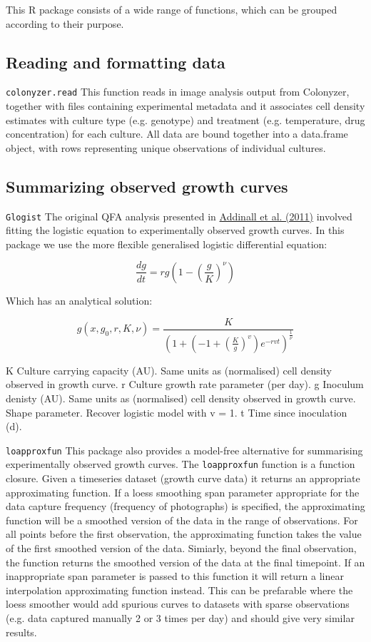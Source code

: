 \documentclass [a4paper]{article}
\begin{document}
This R package consists of a wide range of functions, which can be grouped according to their purpose.

\subsection{Reading and formatting data}
\verb$colonyzer.read$
This function reads in image analysis output from Colonyzer, together with files containing experimental metadata and it associates cell density estimates with culture type (e.g. genotype) and treatment (e.g. temperature, drug concentration) for each culture.  All data are bound together into a data.frame object, with rows representing unique observations of individual cultures.

\subsection{Summarizing observed growth curves}
\verb$Glogist$
The original QFA analysis presented in \href{http://dx.doi.org/10.1371/journal.pgen.1001362}{Addinall et al. (2011)} involved fitting the logistic equation to experimentally observed growth curves.  In this package we use the more flexible generalised logistic differential equation:

\begin{equation}
\frac{dg}{dt}=rg(1-(\frac{g}{K})^\nu)
\end{equation}

Which has an analytical solution:

\begin{equation}
g(x,g_0,r,K,\nu)=\frac{K}{(1+(-1+(\frac{K}{g})^v)e^{-rvt})^\frac{1}{\nu}}
\end{equation}

K	Culture carrying capacity (AU). Same units as (normalised) cell density observed in growth curve.
r	Culture growth rate parameter (per day).
g	Inoculum denisty (AU). Same units as (normalised) cell density observed in growth curve.
\nu	Shape parameter. Recover logistic model with v = 1.
t	Time since inoculation (d).

\verb$loapproxfun$
This package also provides a model-free alternative for summarising experimentally observed growth curves.  The \verb$loapproxfun$ function is a function closure. Given a timeseries dataset (growth curve data) it returns an appropriate approximating function. If a loess smoothing span parameter appropriate for the data capture frequency (frequency of photographs) is specified, the approximating function will be a smoothed version of the data in the range of observations. For all points before the first observation, the approximating function takes the value of the first smoothed version of the data. Simiarly, beyond the final observation, the function returns the smoothed version of the data at the final timepoint. If an inappropriate span parameter is passed to this function it will return a linear interpolation approximating function instead. This can be prefarable where the loess smoother would add spurious curves to datasets with sparse observations (e.g. data captured manually 2 or 3 times per day) and should give very similar results.
\end{document}
